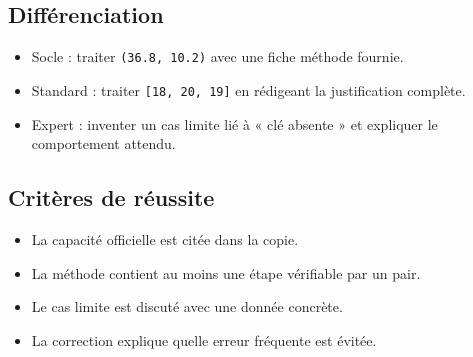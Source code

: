 \subsection{Différenciation}

\begin{itemize}
\tightlist
\item
  Socle : traiter \texttt{(36.8,\ 10.2)} avec une fiche méthode fournie.
\item
  Standard : traiter \texttt{{[}18,\ 20,\ 19{]}} en rédigeant la
  justification complète.
\item
  Expert : inventer un cas limite lié à « clé absente » et expliquer le
  comportement attendu.
\end{itemize}

\subsection{Critères de réussite}

\begin{itemize}
\tightlist
\item
  La capacité officielle est citée dans la copie.
\item
  La méthode contient au moins une étape vérifiable par un pair.
\item
  Le cas limite est discuté avec une donnée concrète.
\item
  La correction explique quelle erreur fréquente est évitée.
\end{itemize}
